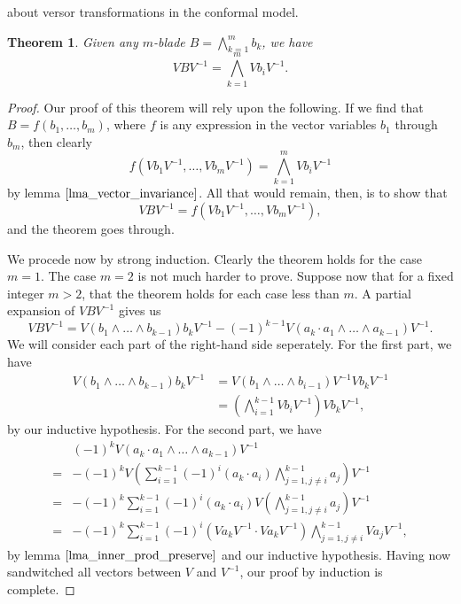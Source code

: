 \documentclass[12pt]{article}
\newtheorem{theorem}{Theorem}[section]
\begin{document}
about versor transformations in the conformal model.
\begin{theorem}\label{thm_outer_prod_preserve}
Given any $m$-blade $B=\bigwedge_{k=1}^m b_k$, we have
\begin{equation*}
VBV^{-1} = \bigwedge_{k=1}^m Vb_iV^{-1}.
\end{equation*}
\end{theorem}
\begin{proof}
Our proof of this theorem will rely upon the following.  If we find that $B=f(b_1,\dots,b_m)$,
where $f$ is any expression in the vector variables $b_1$ through $b_m$, then
clearly
\begin{equation*}
f(Vb_1V^{-1},\dots,Vb_mV^{-1})=\bigwedge_{k=1}^m Vb_iV^{-1}
\end{equation*}
by lemma $\eqref{lma_vector_invariance}$.
All that would remain, then, is to show that
\begin{equation*}
VBV^{-1}=f(Vb_1V^{-1},\dots,Vb_mV^{-1}),
\end{equation*}
and the theorem goes through.

We procede now by strong induction.  Clearly the theorem holds for the case $m=1$.
The case $m=2$ is not much harder to prove.
Suppose now that for a fixed integer $m>2$, that the theorem holds for each case less
than $m$.  A partial expansion of $VBV^{-1}$ gives us
\begin{equation*}
VBV^{-1} = V(b_1\wedge\dots\wedge b_{k-1})b_kV^{-1} - (-1)^{k-1}V(a_k\cdot a_1\wedge\dots\wedge a_{k-1})V^{-1}.
\end{equation*}
We will consider each part of the right-hand side seperately.  For the first part, we have
\begin{align*}
V(b_1\wedge\dots\wedge b_{k-1})b_kV^{-1} &=
V(b_1\wedge\dots\wedge b_{i-1})V^{-1}Vb_kV^{-1} \\
&= \left(\bigwedge_{i=1}^{k-1}Vb_iV^{-1}\right)Vb_kV^{-1},
\end{align*}
by our inductive hypothesis.  For the second part, we have
\begin{align*}
 & (-1)^k V(a_k\cdot a_1\wedge\dots\wedge a_{k-1})V^{-1} \\
 =& -(-1)^k V\left(\sum_{i=1}^{k-1}(-1)^i (a_k\cdot a_i)\bigwedge_{j=1,j\neq i}^{k-1} a_j\right)V^{-1} \\
 =& -(-1)^k\sum_{i=1}^{k-1}(-1)^i (a_k\cdot a_i)V\left(\bigwedge_{j=1,j\neq i}^{k-1} a_j \right)V^{-1} \\
 =& -(-1)^k\sum_{i=1}^{k-1}(-1)^i(Va_kV^{-1}\cdot Va_kV^{-1})\bigwedge_{j=1,j\neq i}^{k-1} Va_jV^{-1},
\end{align*}
by lemma $\eqref{lma_inner_prod_preserve}$ and our inductive hypothesis.
Having now sandwitched all vectors between $V$ and $V^{-1}$, our proof by
induction is complete.
\end{proof}
\end{document}
